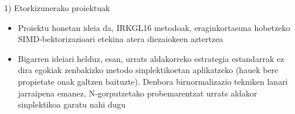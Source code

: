 \documentclass[
 10pt,%
 compress,%
 t,       %
 xcolor=svgnames
]{beamer}
\theoremstyle{definition} \newtheorem{definicion}{Definicion}[section]
\theoremstyle{propiedades} \newtheorem{propiedades}{Propiedades}[section]
\begin{document}
\begin{frame}[fragile]{1) Etorkizunerako proiektuak}
{\begin{itemize}
		\medskip
		\item Proiektu honetan ideia da, IRKGL16 metodoak, eraginkortasuna hobetzeko SIMD-bektorizazioari etekina atera diezaiokeen aztertzea

		
		\medskip
	\item Bigarren ideiari helduz, esan, urrats aldakorreko estrategia estandarrak ez dira egokiak zenbakizko metodo sinplektikoetan aplikatzeko (hauek bere propietate onak galtzen baituzte). Denbora birnormalizazio tekniken lanari jarraipena emanez, N-gorputzetako probemarentzat urrats aldakor sinplektikoa garatu nahi dugu
		
		
		
		
		
	\end{itemize}
	
}





\end{frame}


\end{document}
